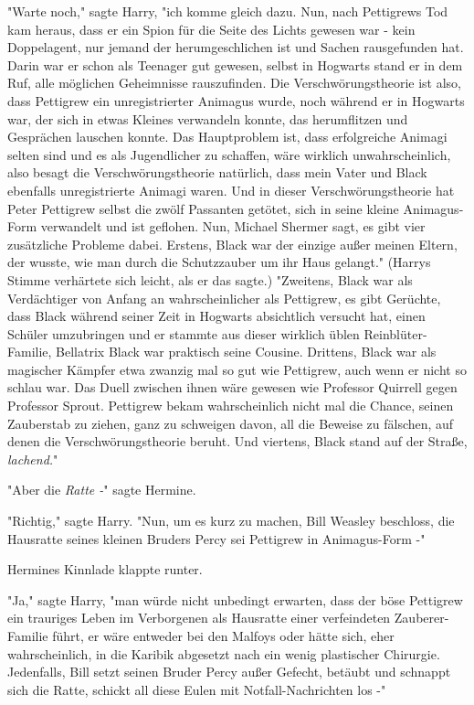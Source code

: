 {"Warte noch," sagte Harry, "ich komme gleich dazu. Nun, nach Pettigrews Tod kam heraus, dass er ein Spion für die Seite des Lichts gewesen war - kein Doppelagent, nur jemand der herumgeschlichen ist und Sachen rausgefunden hat. Darin war er schon als Teenager gut gewesen, selbst in Hogwarts stand er in dem Ruf, alle möglichen Geheimnisse rauszufinden. Die Verschwörungstheorie ist also, dass Pettigrew ein unregistrierter Animagus wurde, noch während er in Hogwarts war, der sich in etwas Kleines verwandeln konnte, das herumflitzen und Gesprächen lauschen konnte. Das Hauptproblem ist, dass erfolgreiche Animagi selten sind und es als Jugendlicher zu schaffen, wäre wirklich unwahrscheinlich, also besagt die Verschwörungstheorie natürlich, dass mein Vater und Black ebenfalls unregistrierte Animagi waren. Und in dieser Verschwörungstheorie hat Peter Pettigrew selbst die zwölf Passanten getötet, sich in seine kleine Animagus-Form verwandelt und ist geflohen. Nun, Michael Shermer sagt, es gibt vier zusätzliche Probleme dabei. Erstens, Black war der einzige außer meinen Eltern, der wusste, wie man durch die Schutzzauber um ihr Haus gelangt." (Harrys Stimme verhärtete sich leicht, als er das sagte.) "Zweitens, Black war als Verdächtiger von Anfang an wahrscheinlicher als Pettigrew, es gibt Gerüchte, dass Black während seiner Zeit in Hogwarts absichtlich versucht hat, einen Schüler umzubringen und er stammte aus dieser wirklich üblen Reinblüter-Familie, Bellatrix Black war praktisch seine Cousine. Drittens, Black war als magischer Kämpfer etwa zwanzig mal so gut wie Pettigrew, auch wenn er nicht so schlau war. Das Duell zwischen ihnen wäre gewesen wie Professor Quirrell gegen Professor Sprout. Pettigrew bekam wahrscheinlich nicht mal die Chance, seinen Zauberstab zu ziehen, ganz zu schweigen davon, all die Beweise zu fälschen, auf denen die Verschwörungstheorie beruht. Und viertens, Black stand auf der Straße, \emph{lachend.}"

"Aber die \emph{Ratte -}" sagte Hermine.

"Richtig," sagte Harry. "Nun, um es kurz zu machen, Bill Weasley beschloss, die Hausratte seines kleinen Bruders Percy sei Pettigrew in Animagus-Form -"

Hermines Kinnlade klappte runter.

"Ja," sagte Harry, "man würde nicht unbedingt erwarten, dass der böse Pettigrew ein trauriges Leben im Verborgenen als Hausratte einer verfeindeten Zauberer-Familie führt, er wäre entweder bei den Malfoys oder hätte sich, eher wahrscheinlich, in die Karibik abgesetzt nach ein wenig plastischer Chirurgie. Jedenfalls, Bill setzt seinen Bruder Percy außer Gefecht, betäubt und schnappt sich die Ratte, schickt all diese Eulen mit Notfall-Nachrichten los -"

}
